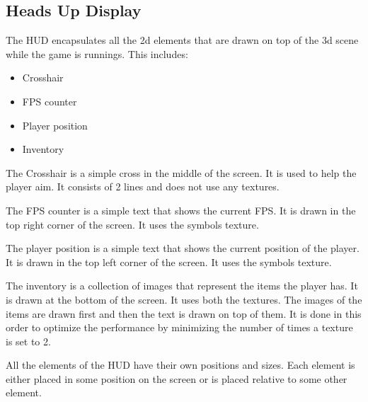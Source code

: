 \subsection{Heads Up Display} \label{sec:hud}
The HUD encapsulates all the 2d elements that are drawn on top of the 3d scene while the game is runnings.
This includes:
\begin{itemize}
    \item Crosshair
    \item FPS counter
    \item Player position
    \item Inventory
\end{itemize}

The Crosshair is a simple cross in the middle of the screen.
It is used to help the player aim.
It consists of 2 lines and does not use any textures.

The FPS counter is a simple text that shows the current FPS.
It is drawn in the top right corner of the screen.
It uses the symbols texture.

The player position is a simple text that shows the current position of the player.
It is drawn in the top left corner of the screen.
It uses the symbols texture.

The inventory is a collection of images that represent the items the player has.
It is drawn at the bottom of the screen.
It uses both the textures.
The images of the items are drawn first and then the text is drawn on top of them.
It is done in this order to optimize the performance by minimizing the number of times a texture is set to 2.

All the elements of the HUD have their own positions and sizes.
Each element is either placed in some position on the screen or is placed relative to some other element.